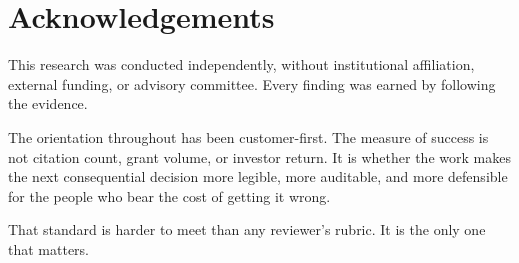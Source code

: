\chapter*{Acknowledgements}

This research was conducted independently, without institutional affiliation, external funding, or advisory committee.
Every finding was earned by following the evidence.

The orientation throughout has been customer-first.
The measure of success is not citation count, grant volume, or investor return.
It is whether the work makes the next consequential decision more legible, more auditable, and more defensible for the people who bear the cost of getting it wrong.

That standard is harder to meet than any reviewer's rubric.
It is the only one that matters.

\newpage
